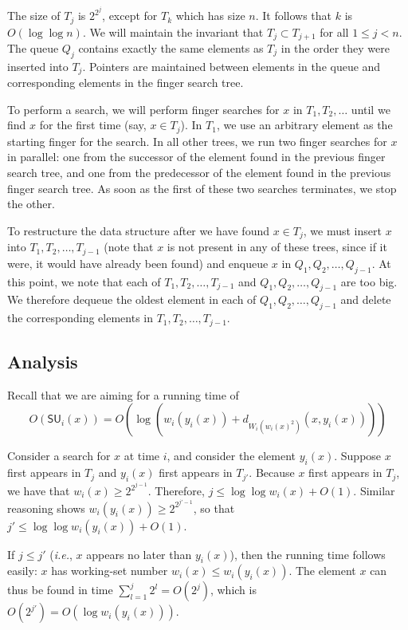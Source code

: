 \documentclass{llncs}
\newcommand{\ie}{\textsl{i.e.}}
\newcommand{\BigOh}[1]{O\!\left(#1\right)}
\newcommand{\SU}[1]{\textsf{SU}_i\!\left(#1\right)}
\begin{document}
The size of $T_j$ is $2^{2^j}$, except for $T_k$ which has size $n$. It follows that $k$ is $\BigOh{\log \log n}$. We will maintain the invariant that $T_j \subset T_{j+1}$ for all $1 \le j < n$. The queue $Q_j$ contains exactly the same elements as $T_j$ in the order they were inserted into $T_j$. Pointers are maintained between elements in the queue and corresponding elements in the finger search tree.

To perform a search, we will perform finger searches for $x$ in $T_1,T_2,\ldots$ until we find $x$ for the first time (say, $x \in T_j$). In $T_1$, we use an arbitrary element as the starting finger for the search. In all other trees, we run two finger searches for $x$ in parallel: one from the successor of the element found in the previous finger search tree, and one from the predecessor of the element found in the previous finger search tree. As soon as the first of these two searches terminates, we stop the other. 

To restructure the data structure after we have found $x \in T_j$, we must insert $x$ into $T_1,T_2,\ldots,T_{j-1}$ (note that $x$ is not present in any of these trees, since if it were, it would have already been found) and enqueue $x$ in $Q_1,Q_2,\ldots,Q_{j-1}$. At this point, we note that each of $T_1,T_2,\ldots,T_{j-1}$ and $Q_1,Q_2,\ldots,Q_{j-1}$ are too big. We therefore dequeue the oldest element in each of $Q_1,Q_2,\ldots,Q_{j-1}$ and delete the corresponding elements in $T_1,T_2,\ldots,T_{j-1}$.

\subsection{Analysis}
\label{section:main:analysis}

Recall that we are aiming for a running time of
\begin{displaymath}
	\BigOh{\SU{x}} = \BigOh{\log (w_i(y_i(x)) + d_{W_i(w_i(x)^2)}(x,y_i(x)))}
\end{displaymath}

Consider a search for $x$ at time $i$, and consider the element $y_i(x)$. Suppose $x$ first appears in $T_j$ and $y_i(x)$ first appears in $T_{j'}$. Because $x$ first appears in $T_j$, we have that $w_i(x) \ge 2^{2^{j-1}}$. Therefore, $j \le \log \log w_i(x) + \BigOh{1}$. Similar reasoning shows $w_i(y_i(x)) \ge 2^{2^{j'-1}}$, so that $j' \le \log \log w_i(y_i(x)) + \BigOh{1}$.

If $j \le j'$ (\ie, $x$ appears no later than $y_i(x)$), then the running time follows easily: $x$ has working-set number $w_i(x) \le w_i(y_i(x))$. The element $x$ can thus be found in time $\sum_{l=1}^j 2^l = \BigOh{2^j}$, which is $\BigOh{2^{j'}} = \BigOh{\log w_i(y_i(x))}$.
\end{document}
